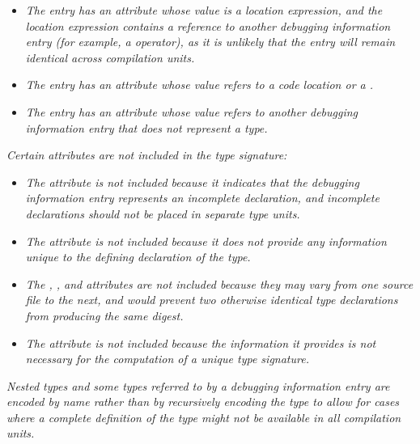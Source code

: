 \begin{itemize}

\item \textit{The entry has an attribute whose value is a location
expression, and the location expression contains a reference to
another debugging information entry (for example, a \DWOPcallref{}
operator), as it is unlikely that the entry will remain
identical across compilation units.}

\item \textit{The entry has an attribute whose value refers
to a code location or a .}

\item \textit{The entry has an attribute whose value refers
to another debugging information entry that does not represent
a type.}
\end{itemize}


\textit{Certain attributes are not included in the type signature:}

\begin{itemize}
\item \textit{The \DWATdeclaration{} attribute is not included because it
indicates that the debugging information entry represents an
incomplete declaration, and incomplete declarations should
not be placed in 
separate type units.}

\item \textit{The \DWATdescription{} attribute is not included because
it does not provide any information unique to the defining
declaration of the type.}

\item \textit{The \DWATdeclfile, 
\DWATdeclline, and
\DWATdeclcolumn{} attributes are not included because they
may vary from one source file to the next, and would prevent
two otherwise identical type declarations from producing the
same \MDfive{} digest.}

\item \textit{The \DWATobjectpointer{} attribute is not included 
because the information it provides is not necessary for the 
computation of a unique type signature.}

\end{itemize}

\textit{Nested types and some types referred to by a debugging 
information entry are encoded by name rather than by recursively 
encoding the type to allow for cases where a complete definition 
of the type might not be available in all compilation units.}


